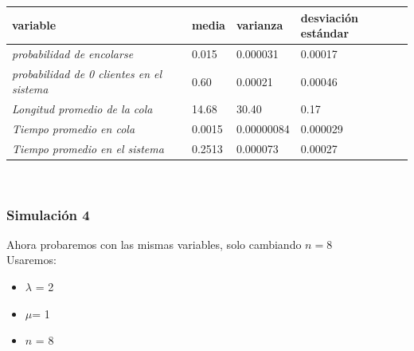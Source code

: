 \documentclass[11pt]{article}
\begin{document}
    \begin{table}[h]
\begin{tabular}{|l|l|l|l|}
\hline
\textbf{variable}                                 & \textbf{media} & \textbf{varianza} & \textbf{desviación estándar} \\ \hline
\textit{probabilidad de encolarse}                & 0.015          & 0.000031             & 0.00017                    \\ \hline
\textit{probabilidad de 0 clientes en el sistema} & 0.60          & 0.00021            & 0.00046                        \\ \hline
\textit{Longitud promedio de la cola}             & 14.68            & 30.40              & 0.17                         \\ \hline
\textit{Tiempo promedio en cola}                  & 0.0015           & 0.00000084            & 0.000029                     \\ \hline
\textit{Tiempo promedio en el sistema}            & 0.2513           & 0.000073             & 0.00027                      \\ \hline
\end{tabular}
\end{table} \\

    \subsubsection{Simulación 4}
    Ahora probaremos con las mismas variables, solo cambiando $ n = 8$ \\
    Usaremos:
    \begin{itemize}
        \item $\lambda$ = 2
        \item $\mu $= 1
        \item $n$ = 8
    \end{itemize} \\
\end{document}
